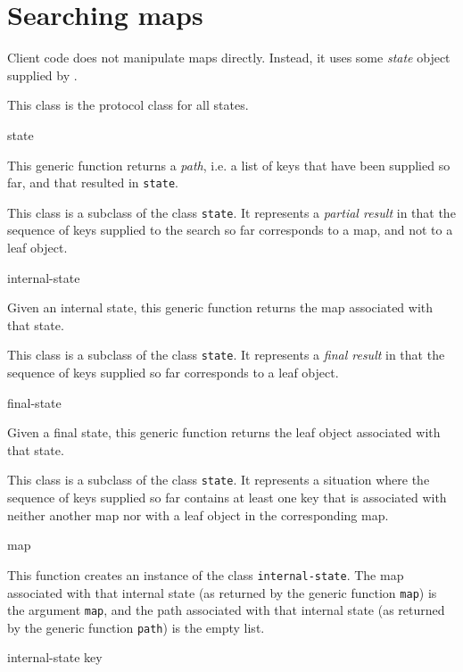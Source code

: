 \chapter{Searching maps}

Client code does not manipulate maps directly.  Instead, it uses some
\emph{state} object supplied by \sysname{}.


This class is the protocol class for all states.

 {state}

This generic function returns a \emph{path}, i.e. a list of keys that
have been supplied so far, and that resulted in \texttt{state}.


This class is a subclass of the class \texttt{state}.  It represents a
\emph{partial result} in that the sequence of keys supplied to the
search so far corresponds to a map, and not to a leaf object.

 {internal-state}

Given an internal state, this generic function returns the map
associated with that state.


This class is a subclass of the class \texttt{state}.  It represents a
\emph{final result} in that the sequence of keys supplied so far
corresponds to a leaf object.

 {final-state}

Given a final state, this generic function returns the leaf object
associated with that state.


This class is a subclass of the class \texttt{state}.  It represents a
situation where the sequence of keys supplied so far contains at least
one key that is associated with neither another map nor with a leaf
object in the corresponding map.

 {map}

This function creates an instance of the class
\texttt{internal-state}.  The map associated with that internal state
(as returned by the generic function \texttt{map}) is the argument
\texttt{map}, and the path associated with that internal state (as
returned by the generic function \texttt{path}) is the empty list.

 {internal-state key}


